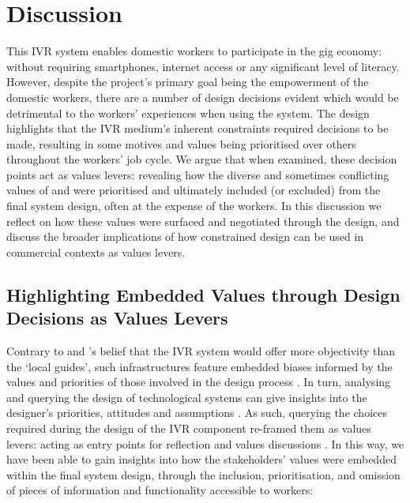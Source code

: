 \section{Discussion}

This IVR system enables domestic workers to participate in the gig economy: without requiring smartphones, internet access or any significant level of literacy. However, despite the project's primary goal being the empowerment of the domestic workers, there are a number of design decisions evident which would be detrimental to the workers' experiences when using the system. The design highlights that the IVR medium's inherent constraints required decisions to be made, resulting in some motives and values being prioritised over others throughout the workers' job cycle. We argue that when examined, these decision points act as values levers: revealing how the diverse and sometimes conflicting values of \PC{} and \NGO{} were prioritised and ultimately included (or excluded) from the final system design, often at the expense of the workers. In this discussion we reflect on how these values were surfaced and negotiated through the design, and discuss the broader implications of how constrained design can be used in commercial contexts as values levers. 


\subsection{Highlighting Embedded Values through Design Decisions as Values Levers}

Contrary to \PC{} and \NGO{}'s belief that the IVR system would offer more objectivity than the `local guides', such infrastructures feature embedded biases informed by the values and priorities of those involved in the design process \citep{winner1980}. In turn, analysing and querying the design of technological systems can give insights into the designer's priorities, attitudes and assumptions \citep{Star1999}. As such, querying the choices required during the design of the IVR component re-framed them as values levers: acting as entry points for reflection and values discussions \cite{Shilton2013}. In this way, we have been able to gain insights into how the stakeholders' values were embedded within the final system design, through the inclusion, prioritisation, and omission of pieces of information and functionality accessible to workers:

